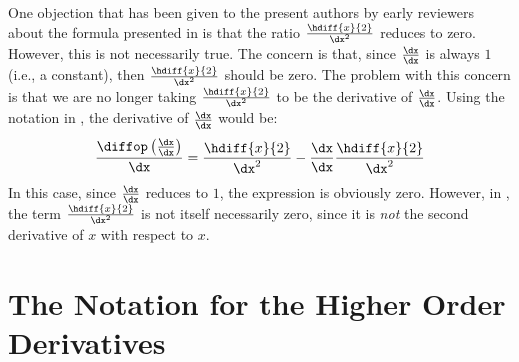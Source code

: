 One objection that has been given to the present authors by early reviewers about the formula presented in  is that the ratio $\frac{\hdiff{x}{2}}{\dx^2}$ reduces to zero.
However, this is not necessarily true.
The concern is that, since $\frac{\dx}{\dx}$ is always $1$ (i.e., a constant), then $\frac{\hdiff{x}{2}}{\dx^2}$ should be zero.
The problem with this concern is that we are no longer taking $\frac{\hdiff{x}{2}}{\dx^2}$ to be the derivative of $\frac{\dx}{\dx}$.
Using the notation in , the derivative of $\frac{\dx}{\dx}$ would be:
\begin{equation}
\label{dxdxderiv}
\frac{\diffop\left(\frac{\dx}{\dx}\right)}{\dx} = \frac{\hdiff{x}{2}}{\dx^2} - \frac{\dx}{\dx}\frac{\hdiff{x}{2}}{\dx^2}
\end{equation}
In this case, since $\frac{\dx}{\dx}$ reduces to $1$, the expression is obviously zero.
However, in , the term $\frac{\hdiff{x}{2}}{\dx^2}$ is not itself necessarily zero, since it is \emph{not} the second derivative of $x$ with respect to $x$.


\section{The Notation for the Higher Order Derivatives}

